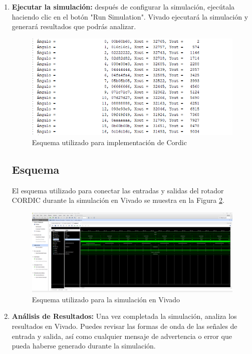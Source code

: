 \documentclass[12pt,a4paper, twoside]{article} %
\begin{document}
\begin{enumerate}
    
    \item \textbf{Ejecutar la simulación:} después de configurar la simulación, ejecútala haciendo clic en el botón "Run Simulation". Vivado ejecutará la simulación y generará resultados que podrás analizar.
    

    \begin{figure}[ht]
    \centering
    \includegraphics[width=1\textwidth,natwidth=610,natheight=642]{./Figuras/Resultado.png}
    \caption{Esquema utilizado para implementación de Cordic}
    \label{fig:esquema}
    \end{figure}
    
\subsection{Esquema}

El esquema utilizado para conectar las entradas y salidas del rotador CORDIC durante la simulación en Vivado se muestra en la Figura \ref{fig:esquema}.

\begin{figure}[ht]
    \centering
    \includegraphics[width=1\textwidth,natwidth=610,natheight=642]{./Figuras/Run_simulacion_visual.png}
    \caption{Esquema utilizado para la simulación en Vivado}
    \label{fig:esquema}
\end{figure}
    
    \item \textbf{Análisis de Resultados:} Una vez completada la simulación, analiza los resultados en Vivado. Puedes revisar las formas de onda de las señales de entrada y salida, así como cualquier mensaje de advertencia o error que pueda haberse generado durante la simulación.
\end{enumerate}
\end{document}
